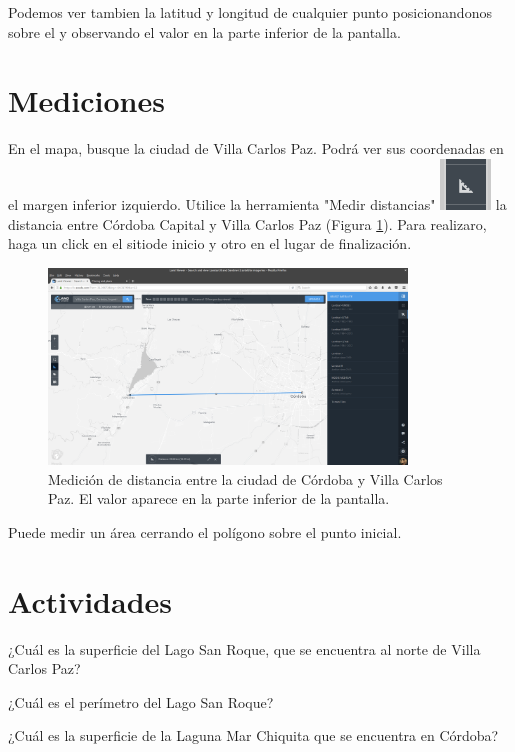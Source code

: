 \documentclass[a4paper,12pt]{book}
\begin{document}
Podemos ver tambien la latitud y longitud de cualquier punto posicionandonos sobre el y observando el valor en la parte inferior de la pantalla.




\section{Mediciones}

En el mapa, busque la ciudad de Villa Carlos Paz. Podrá ver sus coordenadas en el margen inferior izquierdo. Utilice la herramienta "Medir distancias" \includegraphics[scale=0.2]{in:medir.png} la distancia entre Córdoba Capital y Villa Carlos Paz (Figura \ref{fig:distancia}). Para realizaro, haga un click en el sitiode inicio y otro en el lugar de finalización.

\begin{figure}[!h]
    \centering
    \includegraphics[width=0.85\textwidth]{fig:distancia.png}
    \caption{Medición de distancia entre la ciudad de Córdoba y Villa Carlos Paz. El valor aparece en la parte inferior de la pantalla.}
    \label{fig:distancia}
\end{figure}

Puede medir un área cerrando el polígono sobre el punto inicial.

\section{Actividades}

\begin{que}
    ¿Cuál es la superficie del Lago San Roque, que se encuentra al norte de Villa Carlos Paz?
\end{que}
\begin{que}
    ¿Cuál es el perímetro del Lago San Roque?
\end{que}
\begin{que}
    ¿Cuál es la superficie de la Laguna Mar Chiquita que se encuentra en Córdoba?
\end{que}
\end{document}
